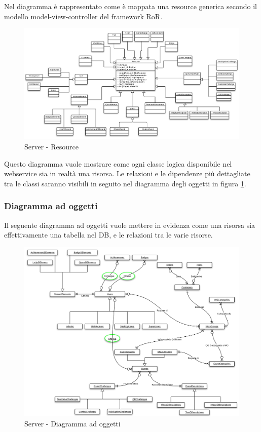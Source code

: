 Nel diagramma è rappresentato come è mappata una resource generica secondo il modello model-view-controller del framework RoR.

\begin{figure}[H]
\centering
\includegraphics[scale=0.50]{images/cap2/Server/Resource.png}
\caption{Server - Resource}
\end{figure}

Questo diagramma vuole mostrare come ogni classe logica disponibile nel webservice sia in realtà una risorsa. Le relazioni e le dipendenze più dettagliate tra le classi saranno visibili in seguito nel diagramma degli oggetti in figura \ref{S-do}.\\


\subsubsection{Diagramma ad oggetti}
Il seguente diagramma ad oggetti vuole mettere in evidenza come una risorsa sia effettivamente una tabella nel DB, e le relazioni tra le varie risorse.

\begin{figure}[h]
\centering
\includegraphics[scale=0.55]{images/cap2/Server/Oggetti.png}
\caption{Server - Diagramma ad oggetti}
\label{S-do}  %
\end{figure}

